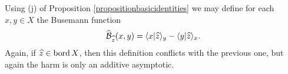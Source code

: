 
\begin{observation}
Using (j) of Proposition \ref{propositionbasicidentities} we may define for each $x,y\in X$ the Busemann function
\[
\widehat{\operatorname{\mathcal B}}_{\widehat z}(x,y) = \langle x|\widehat z\rangle_y - \langle y|\widehat z\rangle_x.
\]
Again, if $\widehat z\in\operatorname{bord} X$, then this definition conflicts with the previous one, but again the harm is only an additive asymptotic.
\end{observation}

